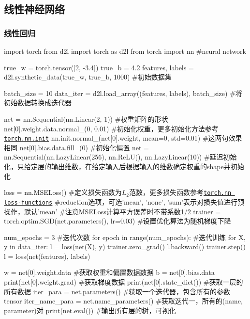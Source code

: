   \subsection{线性神经网络}
    \subsubsection{线性回归}
      \begin{codeblock}[language=python, caption=]
        import torch
        from d2l import torch as d2l
        from torch import nn #neural network

        true_w = torch.tensor([2, -3.4])
        true_b = 4.2
        features, labels = d2l.synthetic_data(true_w, true_b, 1000) #初始数据集

        batch_size = 10
        data_iter = d2l.load_array((features, labels), batch_size) #将初始数据转换成迭代器

        net = nn.Sequential(nn.Linear(2, 1)) #权重矩阵的形状
        net[0].weight.data.normal_(0, 0.01) #初始化权重，更多初始化方法参考\href{https://pytorch.org/docs/stable/nn.init.html}{\underline{\texttt{torch.nn.init}}}
        nn.init.normal_(net[0].weight, mean=0, std=0.01) #这两句效果相同
        net[0].bias.data.fill_(0) #初始化偏置
        net = nn.Sequential(nn.LazyLinear(256), nn.ReLU(), nn.LazyLinear(10)) 
            #延迟初始化，只给定层的输出维数，在给定输入后根据输入的维数确定权重的shape并初始化

        loss = nn.MSELoss() #定义损失函数为$L_2$范数，更多损失函数参考\href{https://pytorch.org/docs/stable/nn.html#loss-functions}{\underline{\texttt{torch.nn loss-functions}}}
            #reduction选项，可选'mean', 'none', 'sum'表示对损失值进行预操作，默认'mean'
            #注意MSELoss计算平方误差时不带系数1/2
        trainer = torch.optim.SGD(net.parameters(), lr=0.03) #设置优化算法为随机梯度下降

        num_epochs = 3 #迭代次数
        for epoch in range(num_epochs): #迭代训练
            for X, y in data_iter:
                l = loss(net(X), y)
                trainer.zero_grad()
                l.backward()
                trainer.step()
            l = loss(net(features), labels)

        w = net[0].weight.data #获取权重和偏置数据数据
        b = net[0].bias.data
        print(net[0].weight.grad) #获取梯度数据
        print(net[0].state_dict()) #获取一层的所有数据
        iter_para = net.parameters() #获取一个迭代器，包含所有的参数tensor
        iter_name_para = net.name_parameters() #获取迭代一，所有的(name, parameter)对
        print(net.eval()) #输出所有层的树，可视化
      \end{codeblock}

